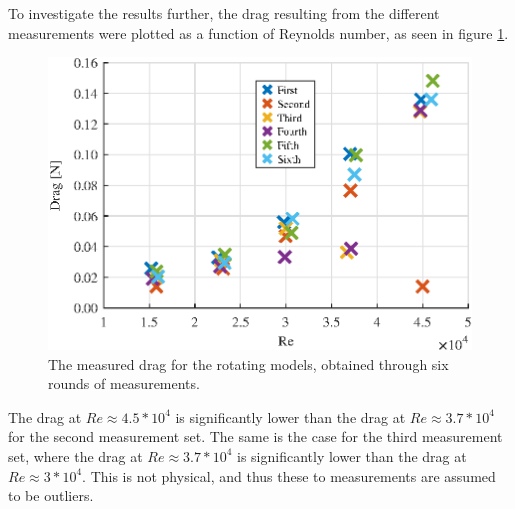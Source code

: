 To investigate the results further, the drag resulting from the different measurements were plotted as a function of Reynolds number, as seen in figure \ref{fig:RotationalDrag}.


\begin{figure}
    \centering
    \includegraphics[width=\linewidth]{0_Images/RotationalDragRe.eps}
    \caption{The measured drag for the rotating models, obtained through six rounds of measurements.}
    \label{fig:RotationalDrag}
\end{figure}

The drag at $Re \approx 4.5*10^4$ is significantly lower than the drag at $Re \approx 3.7*10^4$ for the second measurement set. The same is the case for the third measurement set, where the drag at $Re \approx 3.7*10^4$ is significantly lower than the drag at $Re \approx 3*10^4$. This is not physical, and thus these to measurements are assumed to be outliers. 

